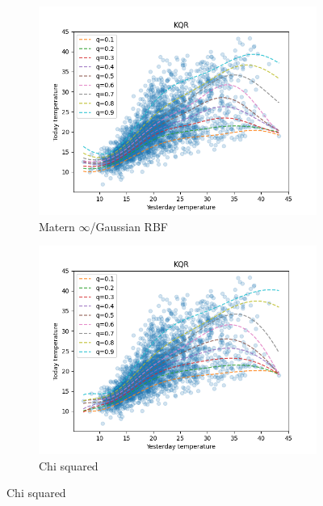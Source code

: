 \begin{figure}[!h]
\begin{subfigure}[b]{0.5\linewidth}
    \end{subfigure} 
    \begin{subfigure}[b]{0.5\linewidth}
        \centering
        \includegraphics[width=1.1\textwidth]{images/melbourne_gaussian_rbf_kernel_quantile_regression.png}
        \caption{Matern $\infty$/Gaussian RBF} 
        \label{} 
        \vspace{4ex}
    \end{subfigure} 
    \begin{subfigure}[b]{0.5\linewidth}
        \centering
        \includegraphics[width=1.1\textwidth]{images/melbourne_chi_squared_kernel_quantile_regression.png}
        \caption{Chi squared} 
        \label{} 
        \vspace{4ex}
    \end{subfigure} 
    \end{figure}

